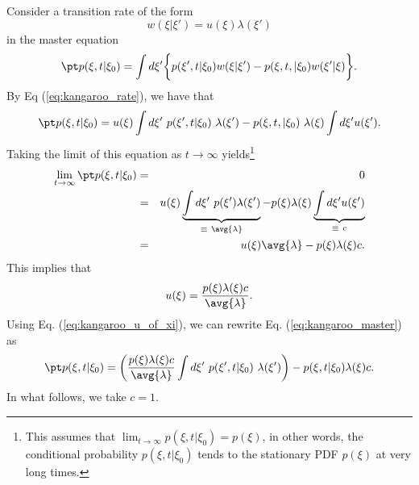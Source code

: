 

Consider a transition rate of the form 
\begin{equation}
w(\xi|\xi') = u(\xi) \lambda(\xi') \label{eq:kangaroo_rate}
\end{equation} 
in the master equation
\begin{equation}
\pt p(\xi, t | \xi_0) = \int d\xi' \bigg\{ p(\xi', t | \xi_0) w(\xi|\xi') -  p(\xi, t, |\xi_0) w(\xi'|\xi) \bigg\}. \nonumber
\end{equation}
By Eq (\ref{eq:kangaroo_rate}), we have that
\begin{equation}
\pt p(\xi, t | \xi_0) = u(\xi) \int d \xi'~p(\xi', t | \xi_0) ~\lambda(\xi') - p(\xi, t, |\xi_0)~\lambda(\xi) \int d \xi' u(\xi'). \label{eq:kangaroo_master}
\end{equation}
Taking the limit of this equation as $t\rightarrow \infty$ yields\footnote{This assumes that $\lim_{t\rightarrow \infty} p(\xi, t| \xi_0) = p(\xi)$, in other words, the conditional probability $p(\xi, t | \xi_0)$ tends to the stationary PDF $p(\xi)$ at very long times.}
\begin{eqnarray}
\lim_{t\rightarrow \infty} \pt p(\xi, t| \xi_0) &=& 0 \nonumber \\
&=& u(\xi) \underbrace{\int d \xi'~p(\xi') \lambda(\xi')}_{\equiv~\avg{\lambda}} -  p(\xi) \lambda(\xi) \underbrace{\int d \xi' u(\xi')}_{\equiv ~c} \nonumber \\
&=&  u(\xi)\avg{\lambda} -  p(\xi) \lambda(\xi) c. \nonumber
\end{eqnarray}
This implies that
\begin{equation}
u(\xi) = \frac{p(\xi) \lambda(\xi)c}{\avg{\lambda}}. \nonumber \label{eq:kangaroo_u_of_xi}
\end{equation}
Using Eq. (\ref{eq:kangaroo_u_of_xi}), we can rewrite Eq. (\ref{eq:kangaroo_master}) as
\begin{equation}
\pt p(\xi, t | \xi_0) = \bigg( \frac{p(\xi)\lambda(\xi)c}{\avg{\lambda}} \int d \xi'~p(\xi', t | \xi_0)~\lambda(\xi') \bigg) - p(\xi, t | \xi_0) \lambda(\xi) c. \label{eq:kangaroo_simplified_master}
\end{equation}
In what follows, we take $c=1$.

